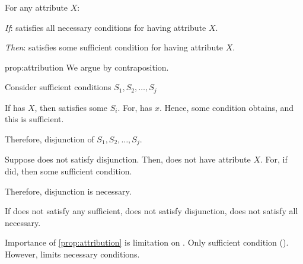 \begin{note}
  \begin{proposition}[Attribution]
    \label{prop:attribution}
    For any attribute \(X\):
    \begin{itenum}
    \item[\emph{If}:]
      \vAgent{} satisfies all necessary conditions for having attribute \(X\).
    \item[\emph{Then}:]
      \vAgent{} satisfies some sufficient condition for having attribute \(X\).
    \end{itenum}
    \vspace{-\baselineskip}
  \end{proposition}

  \begin{argument}{prop:attribution}
    We argue by contraposition.

    Consider sufficient conditions \(S_{1}, S_{2}, \dots, S_{j}\)

    If \vAgent{} has \(X\), then \vAgent{} satisfies some \(S_{i}\).
    For, \vAgent{} has \(x\).
    Hence, some condition obtains, and this is sufficient.

    Therefore, disjunction of \(S_{1}, S_{2}, \dots, S_{j}\).

    Suppose \vAgent{} does not satisfy disjunction.
    Then, \vAgent{} does not have attribute \(X\).
    For, if did, then some sufficient condition.

    Therefore, disjunction is necessary.

    If does not satisfy any sufficient, does not satisfy disjunction, does not satisfy all necessary.
  \end{argument}
\end{note}

\begin{note}
  Importance of \autoref{prop:attribution} is limitation on \ros{}.
  Only sufficient condition (\supportI{}).
  However, \supportII{} limits necessary conditions.
\end{note}

